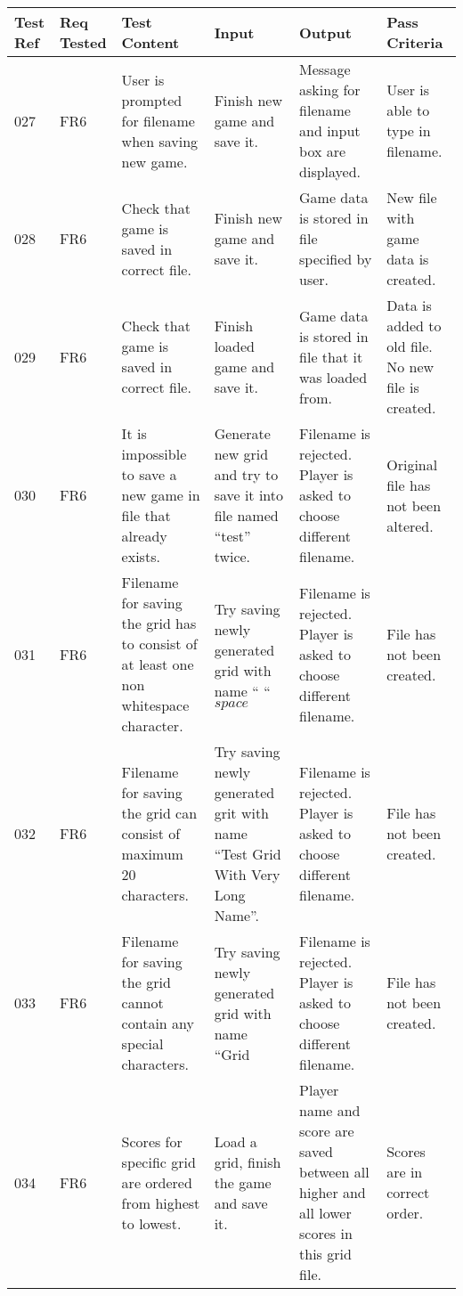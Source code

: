 \documentclass{project}
\begin{document}
\begin{longtable}{|p{0.7cm}|p{1cm}|p{3.5cm}|p{3.2cm}|p{3.5cm}|p{3.5cm}|}
\hline
Test Ref & Req Tested & Test Content & Input  & Output & Pass Criteria \\ \hline \hline


027 & FR6 & User is prompted for filename when saving new game. & Finish new game and save it. & Message asking  for filename and input box are displayed.
& User is able to type in filename. \\ \hline

028 & FR6 & Check that game is saved in correct file. & Finish new game and save it. & Game data is stored in file specified by user.
& New file with game data is created. \\ \hline

029 & FR6 & Check that game is saved in correct file. & Finish loaded game and save it. & Game data is stored in file that it was loaded from.
& Data is added to old file. No new file is created. \\ \hline

030 & FR6 & It is impossible to save a new game in file that already exists. & Generate new grid  and try to save it into file named “test” twice. 
& Filename is rejected. Player is asked to choose different filename. & Original file has not been altered. \\ \hline

031 & FR6 & Filename for saving the grid has to consist of at least one non whitespace character. & Try saving newly generated grid with name “ “ \(space\)
& Filename is rejected. Player is asked to choose different filename.  & File has not been created. \\ \hline

032 & FR6 & Filename for saving the grid can consist of maximum 20 characters. & Try saving newly generated grit with name “Test Grid With Very Long Name”.
& Filename is rejected. Player is asked to choose different filename. & File has not been created. \\ \hline

033 & FR6 & Filename for saving the grid cannot contain any special characters. & Try saving newly generated grid with name “Grid%
&Filename is rejected. Player is asked to choose different filename. & File has not been created. \\ \hline

034 & FR6 & Scores for specific grid are ordered from highest to lowest. & Load a grid, finish the game and save it.
& Player name and score are saved between all higher and all lower scores in this grid file. & Scores are in correct order. \\ \hline

\end{longtable}
\end{document}
